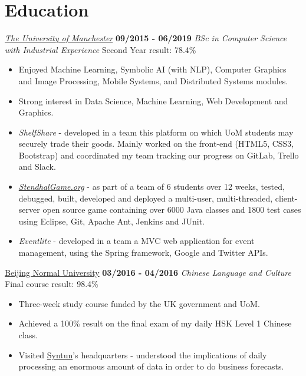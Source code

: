\documentclass[]{friggeri-cv}
\begin{document}
\section{\color{red}Edu\color{gray}cation}
\begin{entrylist}
  \entry
    {}
    {\emph{\href{http://www.manchester.ac.uk/}{The University of Manchester}}}
    {\textbf{09/2015 - 06/2019}}
    {\emph{BSc in Computer Science with Industrial Experience}}
    {Second Year result: 78.4\%}
    \begin{itemize}
        \item Enjoyed Machine Learning, Symbolic AI (with NLP), Computer Graphics and Image Processing, Mobile Systems, and Distributed Systems modules.
        \item Strong interest in Data Science, Machine Learning, Web Development and Graphics.
        \item \emph{ShelfShare} - developed in a team this platform on which UoM students may securely trade their goods. Mainly worked on the front-end (HTML5, CSS3, Bootstrap) and coordinated my team tracking our progress on GitLab, Trello and Slack.
        \item \emph{\href{https://stendhalgame.org/}{StendhalGame.org}} - as part of a team of 6 students over 12 weeks, tested, debugged, built, developed and deployed a multi-user, multi-threaded, client-server open source game containing over 6000 Java classes and 1800 test cases using Eclipse, Git, Apache Ant, Jenkins and JUnit.
        \item \emph{Eventlite} - developed in a team a MVC web application for event management, using the Spring framework, Google and Twitter APIs.\\
    \end{itemize}
  \entry
    {}
    {\href{http://english.bnu.edu.cn/}{Beijing Normal University}}
    {\textbf{03/2016 - 04/2016}}
    {\emph{Chinese Language and Culture}}
    {Final course result: 98.4\%}
    \begin{itemize}
        \item Three-week study course funded by the UK government and UoM.
        \item Achieved a 100\% result on the final exam of my daily HSK Level 1 Chinese class.
        \item Visited \href{http://www.syntun.com/}{Syntun}'s headquarters - understood the implications of daily processing an enormous amount of data in order to do business forecasts.\\

\end{itemize}
\end{entrylist}
\end{document}
